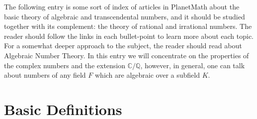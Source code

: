\documentclass[12pt]{article}
\theoremstyle{definition}
\newcommand{\Complex}{\mathbb{C}}
\newcommand{\Rats}{\mathbb{Q}}
\begin{document}
The following entry is some sort of index of articles in PlanetMath about the basic theory of algebraic and transcendental numbers, and it should be studied together with its complement: the theory of rational and irrational numbers. The reader should follow the links in each bullet-point to learn more about each topic. For a somewhat deeper approach to the subject, the reader should read about Algebraic Number Theory. In this entry we will concentrate on the properties of the complex numbers and the extension $\Complex/\Rats$, however, in general, one can talk about numbers of any field $F$ which are algebraic over a subfield $K$.

\section{Basic Definitions}
\end{document}
